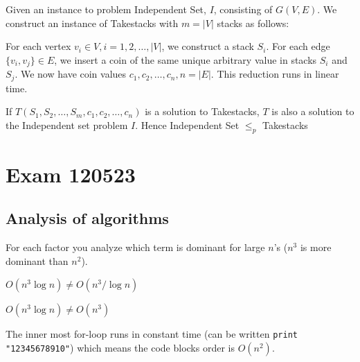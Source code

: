 \documentclass[a4paper]{article}
\newenvironment{task}[1]
{
	\begin{description}[align=right]
		\item [#1]
}{		%
	\end{description}
}
\newcommand{\abs}[1]{\left|#1\right|}
\DeclareMathOperator{\*}{\cdot}
\begin{document}
\begin{task}{(d)}
	\qquad Given an instance to problem Independent Set, $I$, consisting of $G(V,E)$. We construct an instance of Takestacks with $m=\abs{V}$ stacks as follows: 
	
	For each vertex $v_i\in V,i=1,2,\ldots,\abs{V}$, we construct a stack $S_i$. For each edge $\{v_i,v_j\}\in E$, we insert a coin of the same unique arbitrary value in stacks $S_i$ and $S_j$. We now have coin values $c_1,c_2,\ldots,c_n,n=\abs{E}$. This reduction runs in linear time.
	
	If $T(S_1,S_2,\ldots,S_m,c_1,c_2,\ldots,c_n)$ is a solution to Takestacks, $T$ is also a solution to the Independent set problem $I$.
	Hence Independent Set $\leq_p$ Takestacks
\end{task}

\pagebreak
\section*{Exam 120523}
\subsection*{Analysis of algorithms}

\begin{task}{1. (a)}
	 For each factor you analyze which term is dominant for large $n$'s ($n^3$ is more dominant than $n^2$). 
\end{task}

\begin{task}{(b)}
	 $O(n^3\log n)\neq O(n^3/\log n)$
\end{task}

\begin{task}{(c)}
	 $O(n^3\log n)\neq O(n^3)$
\end{task}

\begin{task}{2. (a)}
	 The inner most for-loop runs in constant time (can be written \texttt{print "12345678910"}) which means the code blocks order is $O(n^2)$.
\end{task}
\end{document}
